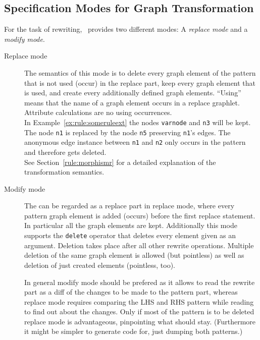 \subsection{Specification Modes for Graph Transformation}
For the task of rewriting, \GrG\ provides two different modes: A \emph{replace mode} and a \emph{modify mode}.
\begin{description}
  \item[Replace mode] The semantics of this mode is to delete every graph element of the pattern that is not used (occur) in the replace part, keep every graph element that is used, and create every additionally defined graph elements. ``Using'' means that the name of a graph element occurs in a replace graphlet. Attribute calculations are no using occurrences.\\
  In Example~\ref{ex:rule:someruleext} the nodes \texttt{varnode} and \texttt{n3} will be kept. The node \texttt{n1} is replaced by the node \texttt{n5} preserving \texttt{n1}'s edges. The anonymous edge instance between \texttt{n1} and \texttt{n2} only occurs in the pattern and therefore gets deleted.\\
See Section~\ref{rule:morphismr} for a detailed explanation of the transformation semantics. 
  \item[Modify mode] The  can be regarded as a replace part in replace mode, where every pattern graph element is added (occurs) before the first replace statement. 
In particular all the  graph elements are kept. 
Additionally this mode supports the \texttt{delete} operator that deletes every element given as an argument. 
Deletion takes place after all other rewrite operations. Multiple deletion of the same graph element is allowed (but pointless) as well as deletion of just created elements (pointless, too).

\begin{note}
In general modify mode should be prefered as it allows to read the rewrite part as a diff of the changes to be made to the pattern part, whereas replace mode requires comparing the LHS and RHS pattern while reading to find out about the changes.
Only if most of the pattern is to be deleted replace mode is advantageous, pinpointing what should stay.
(Furthermore it might be simpler to generate code for, just dumping both patterns.)
\end{note}


\end{description}
